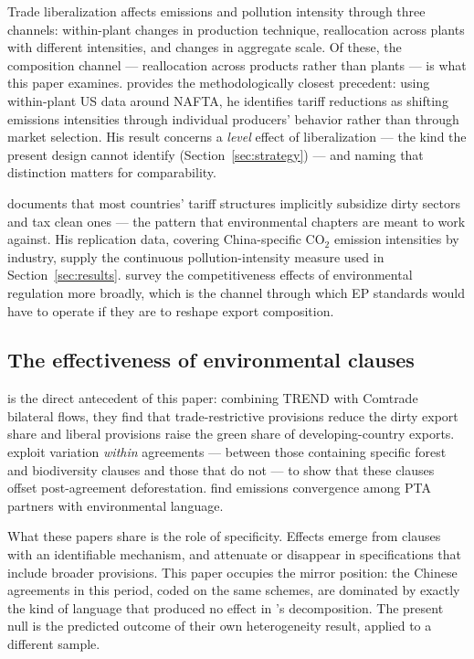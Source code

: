 \documentclass[12pt]{article}
\begin{document}
Trade liberalization affects emissions and pollution intensity through three channels: within-plant changes in production technique, reallocation across plants with different intensities, and changes in aggregate scale. Of these, the composition channel --- reallocation across products rather than plants --- is what this paper examines. \citet{cherniwchan2017} provides the methodologically closest precedent: using within-plant US data around NAFTA, he identifies tariff reductions as shifting emissions intensities through individual producers' behavior rather than through market selection. His result concerns a \emph{level} effect of liberalization --- the kind the present design cannot identify (Section~\ref{sec:strategy}) --- and naming that distinction matters for comparability.

\citet{shapiro2021} documents that most countries' tariff structures implicitly subsidize dirty sectors and tax clean ones --- the pattern that environmental chapters are meant to work against. His replication data, covering China-specific CO$_2$ emission intensities by industry, supply the continuous pollution-intensity measure used in Section~\ref{sec:results}. \citet{dechezlepretre2017} survey the competitiveness effects of environmental regulation more broadly, which is the channel through which EP standards would have to operate if they are to reshape export composition.

\subsection*{The effectiveness of environmental clauses}

\citet{brandi2020} is the direct antecedent of this paper: combining TREND with Comtrade bilateral flows, they find that trade-restrictive provisions reduce the dirty export share and liberal provisions raise the green share of developing-country exports. \citet{abman2024} exploit variation \emph{within} agreements --- between those containing specific forest and biodiversity clauses and those that do not --- to show that these clauses offset post-agreement deforestation. \citet{baghdadi2013} find emissions convergence among PTA partners with environmental language.

What these papers share is the role of specificity. Effects emerge from clauses with an identifiable mechanism, and attenuate or disappear in specifications that include broader provisions. This paper occupies the mirror position: the Chinese agreements in this period, coded on the same schemes, are dominated by exactly the kind of language that produced no effect in \citet{brandi2020}'s decomposition. The present null is the predicted outcome of their own heterogeneity result, applied to a different sample.
\end{document}
